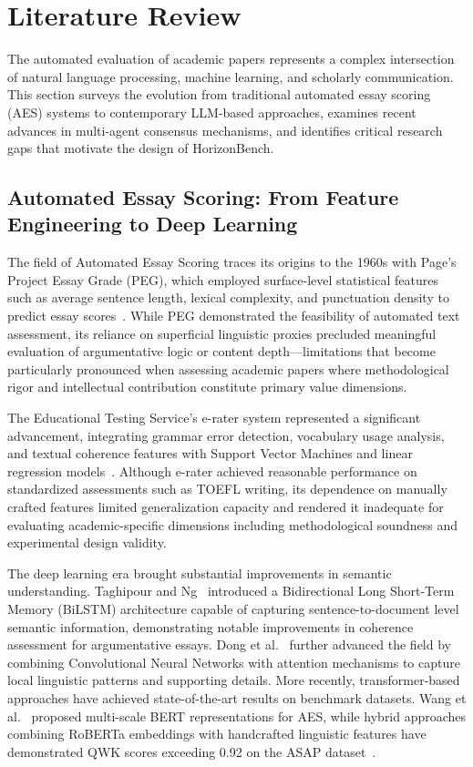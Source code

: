 \section{Literature Review}

The automated evaluation of academic papers represents a complex intersection of natural language processing, machine learning, and scholarly communication. This section surveys the evolution from traditional automated essay scoring (AES) systems to contemporary LLM-based approaches, examines recent advances in multi-agent consensus mechanisms, and identifies critical research gaps that motivate the design of HorizonBench.

\subsection{Automated Essay Scoring: From Feature Engineering to Deep Learning}

The field of Automated Essay Scoring traces its origins to the 1960s with Page's Project Essay Grade (PEG), which employed surface-level statistical features such as average sentence length, lexical complexity, and punctuation density to predict essay scores~\cite{page1966imminence}. While PEG demonstrated the feasibility of automated text assessment, its reliance on superficial linguistic proxies precluded meaningful evaluation of argumentative logic or content depth—limitations that become particularly pronounced when assessing academic papers where methodological rigor and intellectual contribution constitute primary value dimensions.

The Educational Testing Service's e-rater system represented a significant advancement, integrating grammar error detection, vocabulary usage analysis, and textual coherence features with Support Vector Machines and linear regression models~\cite{burstein1998automated}. Although e-rater achieved reasonable performance on standardized assessments such as TOEFL writing, its dependence on manually crafted features limited generalization capacity and rendered it inadequate for evaluating academic-specific dimensions including methodological soundness and experimental design validity.

The deep learning era brought substantial improvements in semantic understanding. Taghipour and Ng~\cite{taghipour2016neural} introduced a Bidirectional Long Short-Term Memory (BiLSTM) architecture capable of capturing sentence-to-document level semantic information, demonstrating notable improvements in coherence assessment for argumentative essays. Dong et al.~\cite{dong2017attention} further advanced the field by combining Convolutional Neural Networks with attention mechanisms to capture local linguistic patterns and supporting details. More recently, transformer-based approaches have achieved state-of-the-art results on benchmark datasets. Wang et al.~\cite{wang2022bert} proposed multi-scale BERT representations for AES, while hybrid approaches combining RoBERTa embeddings with handcrafted linguistic features have demonstrated QWK scores exceeding 0.92 on the ASAP dataset~\cite{iqbal2024hybrid}.

